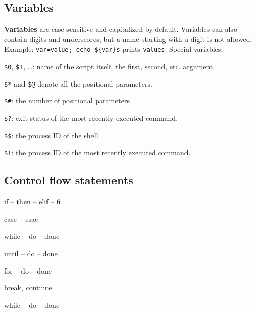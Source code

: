 \subsection{Variables}
\textbf{Variables} are case sensitive and capitalized by default.
Variables can also contain digits and underscores,
but a name starting with a digit is not allowed.
Example: \texttt{var=value; echo \$\{var\}s} prints \texttt{values}.
Special variables:
\begin{enumx}
	\item \texttt{\$0}, \texttt{\$1}, \ldots: name of the script itself,
	the first, second, etc. argument.
	\item \texttt{\$*} and \texttt{\$@} denote all the positional parameters.
	\item \texttt{\$\#}: the number of positional parameters
	\item \texttt{\$?}: exit status of the most recently executed command.
	\item \texttt{\$\$}: the process ID of the shell.
	\item \texttt{\$!}: the process ID of the most recently executed command.
\end{enumx}


\subsection{Control flow statements}
\begin{itemx}
\item if -- then -- elif -- fi
\item case -- esac
\item while -- do -- done
\item until -- do -- done
\item for -- do -- done
\item break, continue
\item while -- do -- done
\end{itemx}

